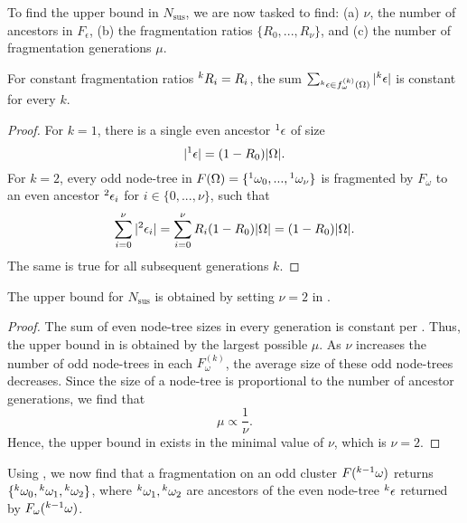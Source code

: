 To find the upper bound in $N_{\text{sus}}$, we are now tasked to find: (a) $\nu$, the number of ancestors in $F_\epsilon$, (b) the fragmentation ratios $\{R_0, ..., R_\nu\}$, and (c) the number of fragmentation generations $\mu$. 

\begin{lemma}\label{lem:evenconstant}
  For constant fragmentation ratios ${}^{k}R_i = R_i$, the sum $\sum_{ {}^{k}\epsilon \in f_\omega^{(k)}(\Omega) }{ \lvert{}^{k}\epsilon\rvert}$ is constant for every $k$. 
\end{lemma}
\begin{proof}
  For $k=1$, there is a single even ancestor ${}^{1}\epsilon$ of size 
  \begin{equation*}
    \lvert{}^{1}\epsilon\rvert = (1 - R_0)\lvert\Omega\rvert.
  \end{equation*}
  For $k=2$, every odd node-tree in $F(\Omega)=\{{}^{1}\omega_0,...,{}^{1}\omega_\nu\}$ is fragmented by $F_\omega$ to an even ancestor ${}^{2}\epsilon_i$ for $i \in \{0,...,\nu \}$, such that 
  \begin{equation*}
    \sum_{i=0}^{\nu}{\lvert{}^{2}\epsilon_i\rvert}  = \sum_{i=0}^{\nu}{R_i(1 - R_0)\lvert\Omega\rvert}= (1 - R_0)\lvert\Omega\rvert.
  \end{equation*}
  The same is true for all subsequent generations $k$. 
\end{proof}

\begin{theorem}\label{the:fragnumber}
  The upper bound for $N_{\text{sus}}$ is obtained by setting $\nu=2$ in . 
\end{theorem}
\begin{proof}
  The sum of even node-tree sizes in every generation is constant per . Thus, the upper bound in  is obtained by the largest possible $\mu$. As $\nu$ increases the number of odd node-trees in each $F^{(k)}_\omega$, the average size of these odd node-trees decreases. Since the size of a node-tree is proportional to the number of ancestor generations, we find that 
  \begin{equation*}
    \mu \propto \frac{1}{\nu}. 
  \end{equation*}
  Hence, the upper bound in  exists in the minimal value of $\nu$, which is $\nu = 2$.
\end{proof}

Using , we now find that a fragmentation on an odd cluster $F({}^{k-1}\omega)$ returns $\{{}^{k}\omega_0, {}^{k}\omega_1, {}^{k}\omega_2\}$, where ${}^{k}\omega_1, {}^{k}\omega_2$ are ancestors of the even node-tree ${}^{k}\epsilon$ returned by $F_\omega({}^{k-1}\omega)$. 

